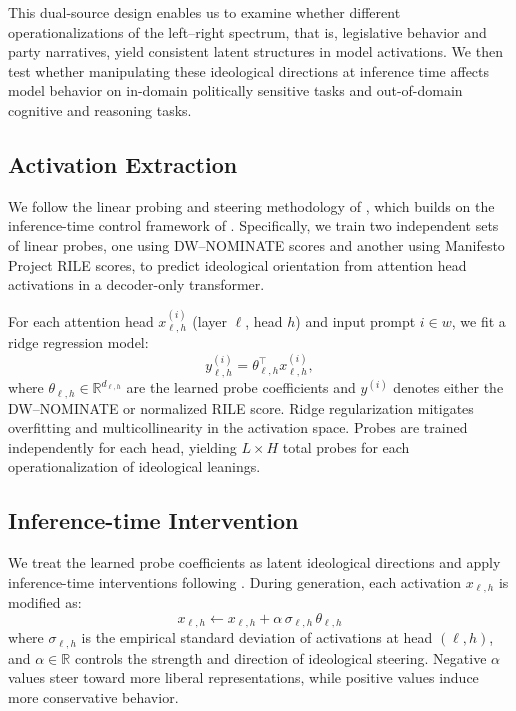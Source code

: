 \documentclass[11pt]{article}
\begin{document}
This dual-source design enables us to examine whether different operationalizations of the left--right spectrum, that is, legislative behavior and party narratives, yield consistent latent structures in model activations. We then test whether manipulating these ideological directions at inference time affects model behavior on in-domain politically sensitive tasks and out-of-domain cognitive and reasoning tasks.

\subsection{Activation Extraction}

We follow the linear probing and steering methodology of \citet{kimLinearRepresentationsPolitical2025}, which builds on the inference-time control framework of \citet{liInferenceTimeInterventionEliciting2023}. Specifically, we train two independent sets of linear probes, one using DW--NOMINATE scores and another using Manifesto Project RILE scores, to predict ideological orientation from attention head activations in a decoder-only transformer.

For each attention head $x_{\ell,h}^{(i)}$ (layer $\ell$, head $h$) and input prompt $i \in w$, we fit a ridge regression model:
\begin{equation*}
    y^{(i)}_{\ell,h} = \theta_{\ell,h}^\top x_{\ell,h}^{(i)},
\end{equation*}
where $\theta_{\ell,h} \in \mathbb{R}^{d_{\ell,h}}$ are the learned probe coefficients and $y^{(i)}$ denotes either the DW--NOMINATE or normalized RILE score. Ridge regularization mitigates overfitting and multicollinearity in the activation space. Probes are trained independently for each head, yielding $L \times H$ total probes for each operationalization of ideological leanings.

\subsection{Inference-time Intervention}
We treat the learned probe coefficients as latent ideological directions and apply inference-time interventions following \citet{liInferenceTimeInterventionEliciting2023}. During generation, each activation $x_{\ell,h}$ is modified as:
\begin{equation*}
    x_{\ell,h} \leftarrow x_{\ell,h} + \alpha \, \sigma_{\ell,h} \, \theta_{\ell,h}
\end{equation*}
where $\sigma_{\ell,h}$ is the empirical standard deviation of activations at head $(\ell,h)$, and $\alpha \in \mathbb{R}$ controls the strength and direction of ideological steering. Negative $\alpha$ values steer toward more liberal representations, while positive values induce more conservative behavior.
\end{document}
